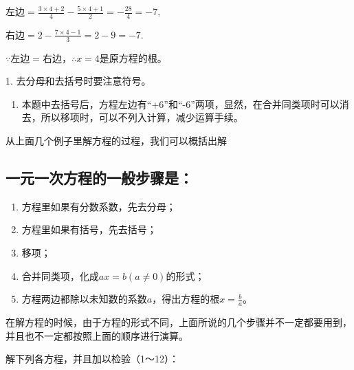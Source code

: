 左边\(= \frac{3\times 4 + 2}{4} -\frac{5\times 4 + 1}{2} = -\frac{28}{4} = -7,\)

右边\(= 2 - \frac{7\times 4 - 1}{3} = 2 - 9 = -7.\)

\(\because\)左边\(=\)右边，\(\therefore x = 4\)是原方程的根。

 1. 去分母和去括号时要注意符号。

\begin{enumerate}[start=2]
\item
  本题中去括号后，方程左边有``+6''和``-6''两项，显然，在合并同类项时可以消去，所以移项时，可以不列入计算，减少运算手续。
\end{enumerate}

从上面几个例子里解方程的过程，我们可以概括出解

\subsection{一元一次方程的一般步骤是：}

\begin{enumerate}
\item
  方程里如果有分数系数，先去分母；
\item
  方程里如果有括号，先去括号；
\item
  移项；
\item
  合并同类项，化成\(ax = b (a \neq 0)\)的形式；
\item
  方程两边都除以未知数的系数\(a\)，得出方程的根\(x = \frac{b}{a}\)。
\end{enumerate}

在解方程的时候，由于方程的形式不同，上面所说的几个步骤并不一定都要用到，并且也不一定都按照上面的顺序进行演算。

解下列各方程，并且加以检验（1～12）：


